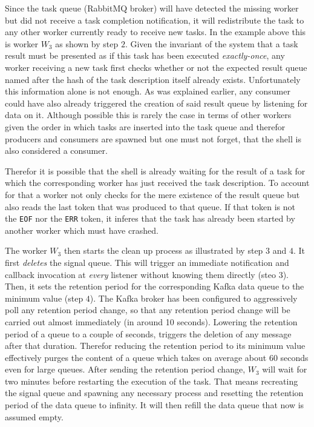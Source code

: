 Since the task queue (RabbitMQ broker) will have detected the
missing worker but did not receive a task completion notification,
it will redistribute the task to any other worker currently
ready to receive new tasks. In the example above this is worker
$W_{3}$ as shown by step $2$. Given the invariant of the system
that a task result must be presented as if this task has been
executed \textit{exactly-once}, any worker receiving a new task
first checks whether or not the expected result queue named after
the hash of the task description itself already exists.
Unfortunately this information alone is not enough. As was
explained earlier, any consumer could have also already triggered
the creation of said result queue by listening for data on it.
Although possible this is rarely the case in terms of other workers
given the order in which tasks are inserted into the task queue
and therefor producers and consumers are spawned but one must not
forget, that the shell is also considered a consumer.

Therefor it is possible that the shell is already waiting for
the result of a task for which the corresponding worker has
just received the task description. To account for that a worker
not only checks for the mere existence of the result queue but also
reads the last token that was produced to that queue. If that
token is not the \texttt{EOF} nor the \texttt{ERR} token, it inferes
that the task has already been started by another worker which
must have crashed.

The worker $W_{3}$ then starts the clean up process as illustrated
by step $3$ and $4$. It first \textit{deletes} the signal queue.
This will trigger an immediate notification and callback invocation
at \textit{every} listener without knowing them directly (steo $3$).
Then, it sets the retention period for the corresponding Kafka
data queue to the minimum value (step $4$). The Kafka broker has been
configured to aggressively poll any retention period change, so that any
retention period change will be carried out almost immediately
(in around 10 seconds). Lowering the retention period of a queue
to a couple of seconds, triggers the deletion of any message after
that duration. Therefor reducing the retention period to its minimum
value effectively purges the content of a queue which takes on average
about $60$ seconds even for large queues.
After sending the retention period change, $W_{3}$ will wait for
two minutes before restarting the execution of the task. That
means recreating the signal queue and spawning any necessary
process and resetting the retention period of the data queue to
infinity. It will then refill the data queue that now is assumed
empty.

